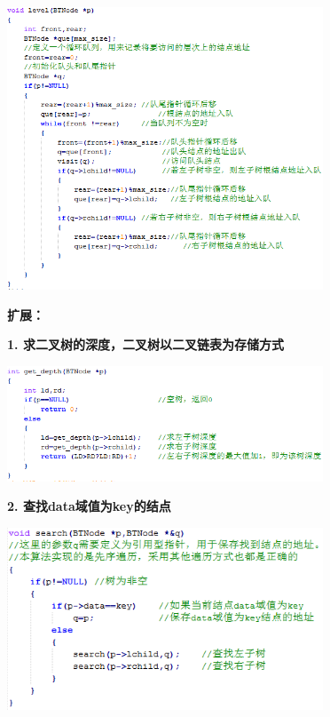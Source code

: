 \includegraphics[width=3.70833in,height=3.31250in]{png-jpeg-pics/324D9D425551BAABF5F198A0DB78E7A4.png}

{\textbf{扩展：}}

{\textbf{1. 求二叉树的深度，二叉树以二叉链表为存储方式}}

\includegraphics[width=3.70833in,height=1.35417in]{png-jpeg-pics/02C244175A0D32E13628EE7D835406E2.png}

{\textbf{2. 查找data域值为key的结点}\\
}

\includegraphics[width=3.70833in,height=2.13542in]{png-jpeg-pics/72561B081410F70646D1B7424340C60D.png}
